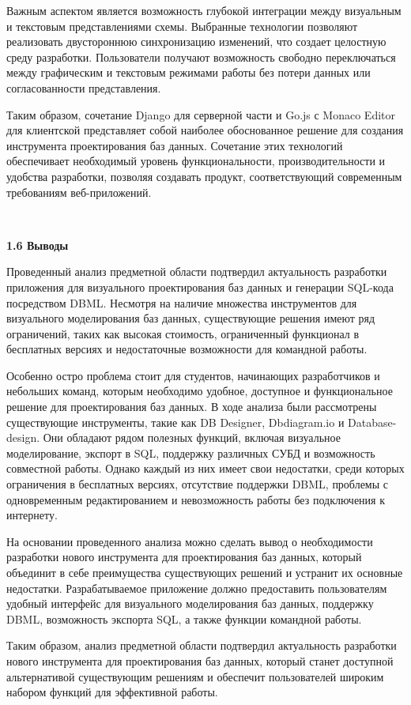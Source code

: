 Важным аспектом является возможность глубокой интеграции между визуальным и текстовым представлениями схемы. Выбранные технологии позволяют реализовать двустороннюю синхронизацию изменений, что создает целостную среду разработки. Пользователи получают возможность свободно переключаться между графическим и текстовым режимами работы без потери данных или согласованности представления.

Таким образом, сочетание Django для серверной части и Go.js с Monaco Editor для клиентской представляет собой наиболее обоснованное решение для создания инструмента проектирования баз данных. Сочетание этих технологий обеспечивает необходимый уровень функциональности, производительности и удобства разработки, позволяя создавать продукт, соответствующий современным требованиям веб-приложений.

\

\textbf{\large 1.6 Выводы}

Проведенный анализ предметной области подтвердил актуальность разработки приложения для визуального проектирования баз данных и генерации SQL-кода посредством DBML. Несмотря на наличие множества инструментов для визуального моделирования баз данных, существующие решения имеют ряд ограничений, таких как высокая стоимость, ограниченный функционал в бесплатных версиях и недостаточные возможности для командной работы.

Особенно остро проблема стоит для студентов, начинающих разработчиков и небольших команд, которым необходимо удобное, доступное и функциональное решение для проектирования баз данных. В ходе анализа были рассмотрены существующие инструменты, такие как DB Designer, Dbdiagram.io и Database-design. Они обладают рядом полезных функций, включая визуальное моделирование, экспорт в SQL, поддержку различных СУБД и возможность совместной работы. Однако каждый из них имеет свои недостатки, среди которых ограничения в бесплатных версиях, отсутствие поддержки DBML, проблемы с одновременным редактированием и невозможность работы без подключения к интернету.

На основании проведенного анализа можно сделать вывод о необходимости разработки нового инструмента для проектирования баз данных, который объединит в себе преимущества существующих решений и устранит их основные недостатки. Разрабатываемое приложение должно предоставить пользователям удобный интерфейс для визуального моделирования баз данных, поддержку DBML, возможность экспорта SQL, а также функции командной работы.

Таким образом, анализ предметной области подтвердил актуальность разработки нового инструмента для проектирования баз данных, который станет доступной альтернативой существующим решениям и обеспечит пользователей широким набором функций для эффективной работы.